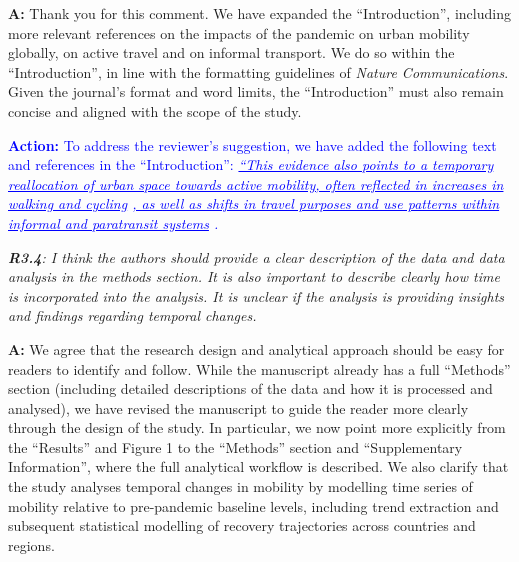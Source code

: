 \documentclass[12pt,a4paper,oneside, reqno]{amsart}
\begin{document}
\setlength{\leftskip}{1cm}\textbf{A:} Thank you for this comment. We have expanded the ``Introduction'', including more relevant references on the impacts of the pandemic on urban mobility globally, on active travel and on informal transport. We do so within the ``Introduction'', in line with the formatting guidelines of \textit{Nature Communications}. Given the journal’s format and word limits, the ``Introduction'' must also remain concise and aligned with the scope of the study.  

\textcolor{blue}{\textbf{Action:} To address the reviewer’s suggestion, we have added the following text and references in the ``Introduction'': \textit{ \uline{``This evidence also points to a temporary reallocation of urban space towards active mobility, often reflected in increases in walking and cycling} \parencite{Brooks2021, DavoudiZavareh2025, Delbosc25, An2025, Nourmohammadi25, Ortar25} \uline{, as well as shifts in travel purposes and use patterns within informal and paratransit systems} \parencite{DiefAllah2025Paratransit, Saha2026}. }}

\setlength{\leftskip}{0cm} \textit{\textbf{R3.4}: I think the authors should provide a clear description of the data and data analysis in the methods section. It is also important to describe clearly how time is incorporated into the analysis. It is unclear if the analysis is providing insights and findings regarding temporal changes.}

\setlength{\leftskip}{1cm}\textbf{A:} We agree that the research design and analytical approach should be easy for readers to identify and follow. While the manuscript already has a full ``Methods'' section (including detailed descriptions of the data and how it is processed and analysed), we have revised the manuscript to guide the reader more clearly through the design of the study. In particular, we now point more explicitly from the ``Results'' and Figure 1 to the ``Methods'' section and ``Supplementary Information'', where the full analytical workflow is described. We also clarify that the study analyses temporal changes in mobility by modelling time series of mobility relative to pre-pandemic baseline levels, including trend extraction and subsequent statistical modelling of recovery trajectories across countries and regions. 
\end{document}
